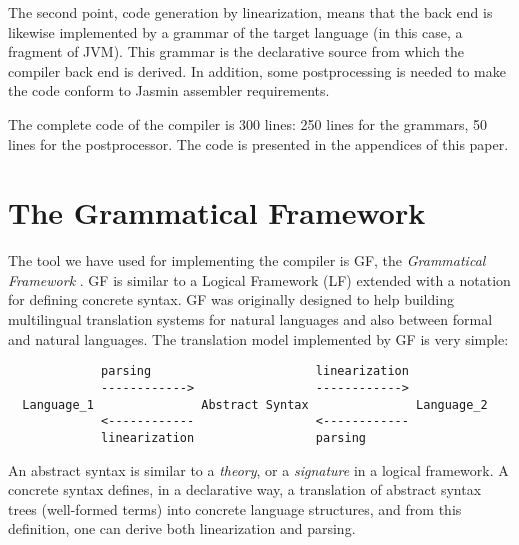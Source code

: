 \documentclass[12pt]{article}
\newcommand{\empha}[1]{{\em #1}}
\begin{document}
The second point, code generation by linearization, means that the
back end is likewise implemented by a grammar of the target
language (in this case, a fragment of JVM). This grammar is the
declarative source from which the compiler back end is derived.
In addition, some postprocessing is needed to
make the code conform to Jasmin assembler requirements.

The complete code of the compiler is 300 lines: 250 lines for the grammars,
50 lines for the postprocessor. The code 
is presented in the appendices of this paper.



\section{The Grammatical Framework}

The tool we have used for implementing the compiler is
GF, the \empha{Grammatical Framework} \cite{gf-jfp}. GF 
is similar to a Logical Framework (LF) 
\cite{harper-honsell}
extended with
a notation for defining concrete syntax. GF was originally
designed to help building multilingual
translation systems for natural languages and also
between formal and natural languages. The translation model
implemented by GF is very simple:
\begin{verbatim}
             parsing                       linearization
             ------------>                 ------------>
  Language_1               Abstract Syntax               Language_2
             <------------                 <------------
             linearization                 parsing
\end{verbatim}
An abstract syntax is similar to a \empha{theory}, or a
\empha{signature} in a logical framework. A 
concrete syntax defines, in a declarative way,
a translation of abstract syntax trees (well-formed terms) 
into concrete language structures, and from this definition, one can
derive both linearization and parsing. 
\end{document}
